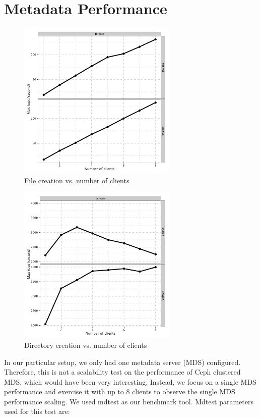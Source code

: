 \section{Metadata Performance}
\label{sec:ceph-meta}

\begin{figure}[htb]
\centering
\includegraphics[width=3in]{data/mdtest-fcreate}
\caption{File creation vs.  number of clients}
\label{fig:mdtest-fcreate}
\end{figure}

\begin{figure}[htb]
\centering
\includegraphics[width=3in]{data/mdtest-dcreate}
\caption{Directory creation vs. number of clients}
\label{fig:mdtest-dcreate}
\end{figure}


In our particular setup, we only had one metadata server (MDS) configured.
Therefore, this is not a scalability test on the performance of Ceph clustered
MDS, which would have been very interesting.  Instead, we focus on a single MDS
performance and exercise it with up to 8 clients to observe the single MDS
performance scaling. We used mdtest as our benchmark tool. Mdtest parameters
used for this test are:

